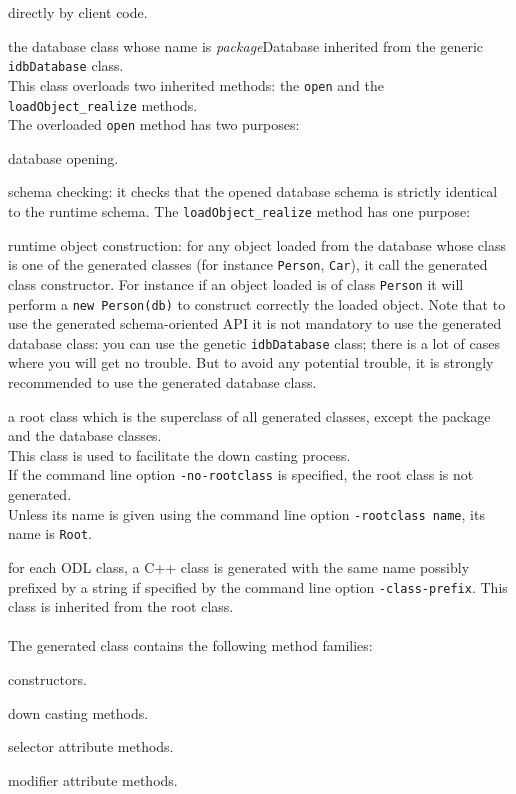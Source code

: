 directly by client code.
\ee
\item the database class whose name is \emph{package}Database inherited
from the generic \texttt{idbDatabase} class.
\\
This class overloads two inherited methods: the \texttt{open} and the
\texttt{loadObject\_realize} methods.
\\
The overloaded \texttt{open} method has two purposes:
\bi
\item database opening.
\item schema checking: it checks that the opened database schema is strictly
identical to the runtime schema.
\ei
The \texttt{loadObject\_realize} method has one purpose:
\bi
\item runtime object construction: for any object loaded from the database
whose class is one of the generated classes
(for instance \texttt{Person}, \texttt{Car}), it call the generated
class constructor. For instance if an object loaded is of class \texttt{Person}
it will perform a \texttt{new Person(db)} to construct correctly
the loaded object.
\ei
Note that to use the generated schema-oriented API it is not mandatory
to use the generated database class: you can use the genetic \texttt{idbDatabase}
class; there is a lot of cases where you will get no trouble.
But to avoid any potential trouble, it is strongly recommended to use the
generated database class.
\item a root class which is the superclass of
all generated classes, except the package and the database classes.
\\
This class is used to facilitate the down casting process.
\\
If the command line option \texttt{-no-rootclass} is specified, the root
class is not generated.
\\
Unless its name is given using the command line option \texttt{-rootclass name},
its name is \texttt{Root}.
\item for each ODL class, a C++ class is generated with the same name
possibly prefixed by a string if specified by the command line option
\texttt{-class-prefix}.
This class is inherited from the root class.
\\
\\
The generated class contains the following method families:
\be
\item constructors.
\item down casting methods.
\item selector attribute methods.
\item modifier attribute methods.
